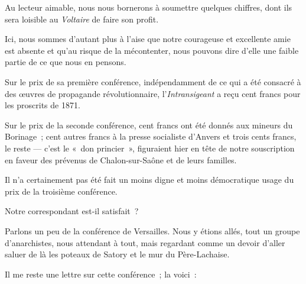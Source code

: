 \documentclass[french,twoside]{book} %
\newcommand{\astertri}{\medskip\par\centerline{\color{rubric}\large\selectfont{\syms ✻\,✻\,✻}}\medskip\par}%
\begin{document}
\noindent Au lecteur aimable, nous nous bornerons à soumettre quelques chiffres, dont ils sera loisible au \emph{Voltaire} de faire son profit.\par
Ici, nous sommes d’autant plus à l’aise que notre courageuse et excellente amie est absente et qu’au risque de la mécontenter, nous pouvons dire d’elle une faible partie de ce que nous en pensons.\par
Sur le prix de sa première conférence, indépendamment de ce qui a été consacré à des œuvres de propagande révolutionnaire, l’\emph{Intransigeant} a reçu cent francs pour les proscrits de 1871.\par
Sur le prix de la seconde conférence, cent francs ont été donnés aux mineurs du Borinage ; cent autres francs à la presse socialiste d’Anvers et trois cents francs, le reste — c’est le « don princier », figuraient hier en tête de notre souscription en faveur des prévenus de Chalon-sur-Saône et de leurs familles.\par
 Il n’a certainement pas été fait un moins digne et moins démocratique usage du prix de la troisième conférence.\par
Notre correspondant est-il satisfait ?\par

\astertri

\noindent Parlons un peu de la conférence de Versailles. Nous y étions allés, tout un groupe d’anarchistes, nous attendant à tout, mais regardant comme un devoir d’aller saluer de là les poteaux de Satory et le mur du Père-Lachaise.\par
Il me reste une lettre sur cette conférence ; la voici :\par
\end{document}
